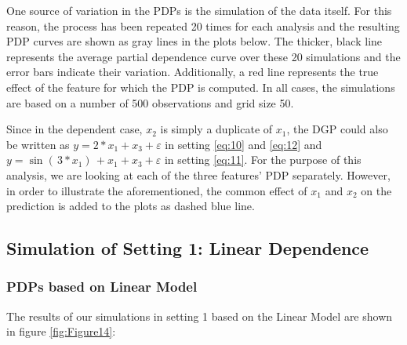 \documentclass[
]{krantz}
\begin{document}
One source of variation in the PDPs is the simulation of the data itself. For this reason, the process has been repeated 20 times for each analysis and the resulting PDP curves are shown as gray lines in the plots below. The thicker, black line represents the average partial dependence curve over these 20 simulations and the error bars indicate their variation. Additionally, a red line represents the true effect of the feature for which the PDP is computed. In all cases, the simulations are based on a number of 500 observations and grid size 50.

Since in the dependent case, \(x_2\) is simply a duplicate of \(x_1\), the DGP could also be written as \(y = 2*x_1 + x_3 + \varepsilon\) in setting \eqref{eq:10} and \eqref{eq:12} and \(y = \sin{( \, 3*x_1 ) \,} + x_1 + x_3 + \varepsilon\) in setting \eqref{eq:11}. For the purpose of this analysis, we are looking at each of the three features' PDP separately. However, in order to illustrate the aforementioned, the common effect of \(x_1\) and \(x_2\) on the prediction is added to the plots as dashed blue line.

\hypertarget{simulation-of-setting-1-linear-dependence}{%
\subsection{Simulation of Setting 1: Linear Dependence}\label{simulation-of-setting-1-linear-dependence}}

\hypertarget{pdps-based-on-linear-model}{%
\subsubsection{PDPs based on Linear Model}\label{pdps-based-on-linear-model}}

The results of our simulations in setting 1 based on the Linear Model are shown in figure \ref{fig:Figure14}:
\end{document}
